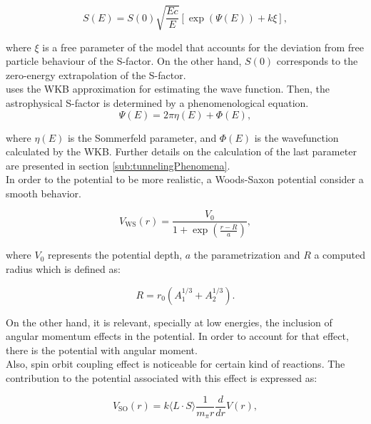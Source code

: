 \documentclass[openany]{book}
\begin{document}
\begin{equation}  \label{eq:potential_Yakovlev_sfactor}
	S(E) = S(0)\sqrt{\frac{Ec}{E}} [\exp{(\Psi(E))+ k\xi} ],
\end{equation}

where $\xi$ is a free parameter of the model that accounts for the deviation from free particle behaviour of the S-factor. On the other hand, $S(0)$ corresponds to the zero-energy extrapolation of the S-factor. \\

uses the WKB approximation for estimating the wave function. Then, the astrophysical S-factor is determined by a phenomenological equation. \\


\begin{equation}  \label{eq:potential_Yakovlev_psiWKB}
	\Psi(E) = 2\pi\eta(E) + \Phi(E),
\end{equation}

where $\eta(E)$ is the Sommerfeld parameter, and $\Phi(E)$ is the wavefunction calculated by the WKB. Further details on the calculation of the last parameter are presented in section \ref{sub:tunnelingPhenomena}. \\

In order to the potential to be more realistic, a Woods-Saxon potential consider a smooth behavior.

\begin{equation} \label{eq:potential_WoodsSaxon}
	V_{\mathrm{WS}}(r) = \frac{V_0}{1 + \exp  \left({\frac{r-R}{a}}\right)},
\end{equation}


where $V_0$ represents the potential depth, $a$ the parametrization and $R$ a computed radius which is defined as: 

\begin{equation} \label{eq:potential_WoodsSaxon_radius}
	R = r_0(A_1^{1/3} + A_2^{1/3}).
\end{equation}

On the other hand, it is relevant, specially at low energies, the inclusion of angular momentum effects in the potential. In order to account for that effect, there is the potential with angular moment. \\

Also, spin orbit coupling effect is noticeable for certain kind of reactions. The contribution to the potential associated with this effect is expressed as:

\begin{equation}  \label{eq:potential_spinOrbit}
	V_{\mathrm{SO}}(r) = k\langle L \cdot S \rangle  \frac{1}{m_{\pi}r} \frac{d}{dr} V(r),
\end{equation}
\end{document}
